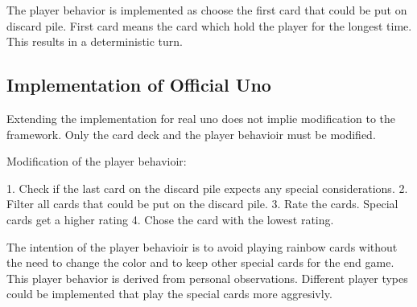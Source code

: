 The player behavior is implemented as choose the first card that could be put on discard pile. First card means the card which hold the player for the longest time. This results in a deterministic turn.


\subsection{Implementation of Official Uno}

Extending the implementation for real uno does not implie modification to the framework. Only the card deck and the player behavioir must be modified.



Modification of the player behavioir:


1. Check if the last card on the discard pile expects any special considerations.
2. Filter all cards that could be put on the discard pile.
3. Rate the cards. Special cards get a higher rating
4. Chose the card with the lowest rating.

The intention of the player behavioir is to avoid playing rainbow cards without the need to change the color and to keep other special cards for the end game. This player behavior is derived from personal observations. Different player types could be implemented that play the special cards more aggresivly.


